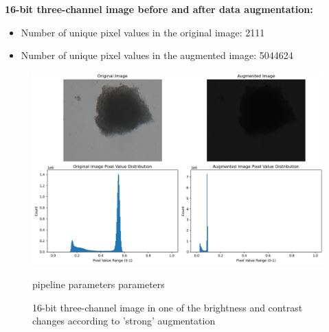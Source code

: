  \textbf{16-bit three-channel image before and after data augmentation:}
  \begin{itemize}
    \item Number of unique pixel values in the original image: 2111
    \item Number of unique pixel values in the augmented image: 5044624
  \end{itemize}
  
  \begin{figure}[H]
    \centering
    \includegraphics[scale=0.4]{figures/16bit_three_1.png} 
    \caption{16-bit three-channel image in one of the brightness and contrast changes according to 'strong' augmentation}pipeline parameters parameters
    \label{fig:16bit_three_v1}
  \end{figure}
   

